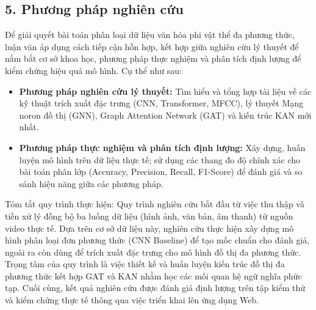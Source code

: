 \subsection{5. Phương pháp nghiên cứu}
\indent\indent Để giải quyết bài toán phân loại dữ liệu văn hóa phi vật thể đa phương thức, luận văn áp dụng cách tiếp cận hỗn hợp, kết hợp giữa nghiên cứu lý thuyết để nắm bắt cơ sở khoa học, phương pháp thực nghiệm và phân tích định lượng để kiểm chứng hiệu quả mô hình. Cụ thể như sau:\vspace{-0.1cm}
\begin{itemize}[label={--}, itemsep=1pt]
    \item \textbf{Phương pháp nghiên cứu lý thuyết:} Tìm hiểu và tổng hợp tài liệu về các kỹ thuật trích xuất đặc trưng (CNN, Transformer, MFCC), lý thuyết Mạng noron đồ thị (GNN), Graph Attention Network (GAT) và kiến trúc KAN mới nhất.
    \item \textbf{Phương pháp thực nghiệm và phân tích định lượng:} Xây dựng, huấn luyện mô hình trên dữ liệu thực tế; sử dụng các thang đo độ chính xác cho bài toán phân lớp (Accuracy, Precision, Recall, F1-Score) để đánh giá và so sánh hiệu năng giữa các phương pháp.
\end{itemize}

Tóm tắt quy trình thực hiện: Quy trình nghiên cứu bắt đầu từ việc thu thập và tiền xử lý đồng bộ ba luồng dữ liệu (hình ảnh, văn bản, âm thanh) từ nguồn video thực tế. Dựa trên cơ sở dữ liệu này, nghiên cứu thực hiện xây dựng mô hình phân loại đơn phương thức (CNN Baseline) để tạo mốc chuẩn cho đánh giá, ngoài ra còn dùng để trích xuất đặc trưng cho mô hình đồ thị đa phương thức. Trọng tâm của quy trình là việc thiết kế và huấn luyện kiến trúc đồ thị đa phương thức kết hợp GAT và KAN nhằm học các mối quan hệ ngữ nghĩa phức tạp. Cuối cùng, kết quả nghiên cứu được đánh giá định lượng trên tập kiểm thử và kiểm chứng thực tế thông qua việc triển khai lên ứng dụng Web.